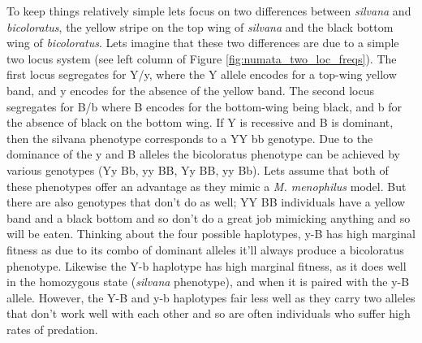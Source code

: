 To keep things relatively simple lets focus on two differences between  {\it silvana} and {\it  bicoloratus}, the yellow stripe on the top wing of {\it silvana} and the black bottom wing of  {\it  bicoloratus}. Lets imagine that these two differences are due to a simple two locus system (see left column of Figure \ref{fig:numata_two_loc_freqs}). The first locus segregates for Y/y, where the Y allele encodes for a top-wing yellow band, and y encodes for the absence of the yellow band. The second locus segregates for B/b where B encodes for the bottom-wing being black, and b for the absence of black on the bottom wing. If Y is recessive and B is dominant, then the silvana phenotype corresponds to a YY bb genotype. Due to the dominance of the y and B alleles the bicoloratus phenotype can be achieved by various genotypes (Yy Bb, yy BB, Yy BB, yy Bb).  Lets assume that both of these phenotypes offer an advantage as they mimic a {\it M. menophilus} model. But there are also genotypes that don't do as well; YY BB individuals have a yellow band and a black bottom and so don't do a great job mimicking anything and so will be eaten. Thinking about the  four possible haplotypes, y-B has high marginal fitness as due to its combo of dominant alleles it'll always produce a bicoloratus phenotype. Likewise the Y-b haplotype has high marginal fitness, as it does well in the homozygous state ({\it silvana} phenotype), and when it is paired with the y-B allele. However, the Y-B and y-b haplotypes fair less well as they carry two alleles that don't work well with each other and so are often individuals who suffer high rates of predation. 

